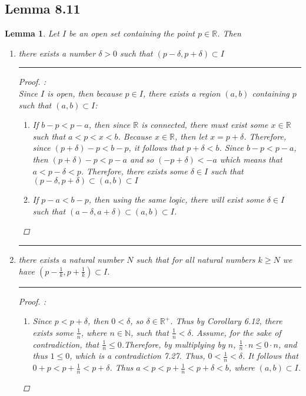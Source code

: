 \documentclass[openany, amssymb, psamsfonts]{amsart}
\newcommand{\bbN}{\mathbb{N}}
\newcommand{\bbR}{\mathbb{R}}
\newtheorem{lem}{Lemma}[section]
\theoremstyle{definition}
\numberwithin{equation}{section}
\begin{document}
\subsection*{Lemma 8.11}
\begin{lem}
\label{8.11}
	Let $I$ be an open set containing the point $p \in \bbR$. Then
\begin{enumerate}
\item[i)] there exists a number $\delta > 0$ such that $(p - \delta, p + \delta) \subset I$
\vspace{4pt}     \hrule   \vspace{4pt}
\begin{proof} :\\
Since $I$ is open, then because $p\in I$, there exists a region $(a,b)$ containing $p$ such that $(a,b)\subset I$:
\begin{enumerate}
    \item If $b-p<p-a$, then since $\bbR$ is connected, there must exist some $x \in \bbR$ such that $a<p<x <b$. Because $x\in \bbR$, then let $x= p+\delta$. Therefore, since $(p+\delta) -p < b-p$, it follows that $p+\delta<b$. Since $b-p < p - a$, then $(p+\delta) -p < p-a$ and so $(-p+\delta) <-a$ which means that $a<p-\delta<p$. Therefore, there exists some $\delta \in I$ such that $(p-\delta, p+\delta) \subset (a,b) \subset I$
    \item If $p-a<b-p$, then using the same logic, there will exist some $\delta \in I$ such that $(a-\delta, a+\delta) \subset (a,b) \subset I$.
\end{enumerate}
\end{proof}\vspace{4pt}     \hrule   \vspace{4pt} 
\item[ii)] there exists a natural number $N$ such that for all natural numbers $k \geq N$ we have $(p - \frac1k, p + \frac1k) \subset I$.
\vspace{4pt}     \hrule   \vspace{4pt}  \begin{proof} :\\
\begin{enumerate}
    \item Since $p<p+\delta$, then $0<\delta$, so $\delta \in \bbR^+$. Thus by Corollary 6.12, there exists some $\frac{1}{n}$, where $n\in \bbN$, such that $\frac{1}{n}<\delta$. Assume, for the sake of contradiction, that $\frac{1}{n}\leq 0$.Therefore, by multiplying by $n$, $\frac{1}{n}\cdot n \leq 0\cdot n$, and thus $1\leq 0$, which is a contradiction 7.27. Thus, $0<\frac{1}{n}<\delta$. It follows that $0+p<p+\frac{1}{n}<p+\delta$. Thus $a<p< p+\frac{1}{n}<p+\delta<b$, where $(a,b)\subset I$.

\end{enumerate}
\end{proof}
\end{enumerate}
\end{lem}
\end{document}
